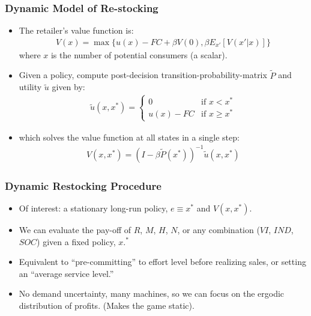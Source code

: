 \documentclass[aspectratio=169]{beamer}
\begin{document}
\begin{frame}
\frametitle{Dynamic Model of Re-stocking}
\begin{itemize}
\item The retailer's value function is:
\begin{eqnarray}
\label{bellman}
V(x) = \max \{u(x) - FC + \beta V(0), \beta E_{x'}[V(x' | x)]\}
\end{eqnarray}
where $x$ is the number of potential consumers (a scalar).
\item Given a policy, compute post-decision transition-probability-matrix $\tilde{P}$ and utility $\tilde{u}$ given by:
\begin{eqnarray*}
 \tilde{u}(x,x^{*})= \begin{cases} 0 &\mbox{if } x < x^{*} \\ 
u(x) - FC & \mbox{if } x \geq x^{*}
 \end{cases}
\end{eqnarray*}
\item which solves the value function at all states in a single step:
\begin{eqnarray}
\label{pistep}
V(x,x^{*}) = (I - \beta \tilde{P}(x^{*}))^{-1} \tilde{u}(x,x^{*}) 
\end{eqnarray}
\end{itemize}
\end{frame}


\begin{frame}
\frametitle{Dynamic Restocking Procedure}
\small
\begin{itemize}
\item Of interest: a stationary long-run policy, $e \equiv x^{*}$ and $V(x,x^{*}).$
\item We can evaluate the pay-off of $R$, $M$, $H$, $N$, or any combination ($VI$, $IND$, $SOC$) given a fixed policy, $x.^*$
\item Equivalent to ``pre-committing'' to effort level before realizing sales, or setting an ``average service level.'' 
\item No demand uncertainty, many machines, so we can focus on the ergodic distribution of profits. (Makes the game static).
\end{itemize}
\end{frame}
\end{document}
